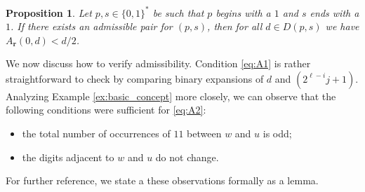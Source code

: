 \documentclass[a4paper,11pt]{amsart}
\newtheorem{prop}[thm]{Proposition}
\theoremstyle{definition}
\begin{document}
\begin{prop} \label{prop:admissible}
Let $p,s \in \{0,1\}^*$ be such that $p$ begins with a $1$ and $s$ ends with a $1$. If there exists an admissible pair for $(p,s)$, then for all $d \in D(p,s)$ we have $A_{\mathbf{r}}(0,d)<d/2$. 
\end{prop}

We now discuss how to verify admissibility. Condition \eqref{eq:A1} is rather straightforward to check by comparing binary expansions of $d$ and $(2^{\ell-i} j+1)$.
Analyzing Example \ref{ex:basic_concept} more closely, we can observe that the following conditions were sufficient for \eqref{eq:A2}:
\begin{itemize}    
    \item the total number of occurrences of $11$ between $w$ and $u$ is odd;
    \item the digits adjacent to $w$ and $u$ do not change.
\end{itemize}

For further reference, we state a these observations formally as a lemma.
\end{document}

